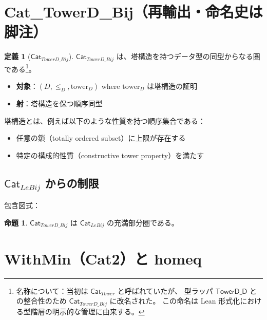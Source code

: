 \documentclass[a4paper,12pt]{ltjsarticle}
\theoremstyle{definition}
\newtheorem{definition}{定義}[section]
\newtheorem{proposition}{命題}[section]
\begin{document}
\section{Cat\_TowerD\_Bij（再輸出・命名史は脚注）}

\begin{definition}[$\mathsf{Cat}_{TowerD\_Bij}$]
$\mathsf{Cat}_{TowerD\_Bij}$ は、塔構造を持つデータ型の同型からなる圏である\footnote{%
  名称について：当初は $\mathsf{Cat}_{Tower}$ と呼ばれていたが、
  型ラッパ $\mathsf{TowerD\_D}$ との整合性のため $\mathsf{Cat}_{TowerD\_Bij}$ に改名された。
  この命名は Lean 形式化における型階層の明示的な管理に由来する。}。

\begin{itemize}
  \item \textbf{対象}：$(D, \le_D, \text{tower}_D)$ where $\text{tower}_D$ は塔構造の証明
  \item \textbf{射}：塔構造を保つ順序同型
\end{itemize}
\end{definition}

塔構造とは、例えば以下のような性質を持つ順序集合である：
\begin{itemize}
  \item 任意の鎖（totally ordered subset）に上限が存在する
  \item 特定の構成的性質（constructive tower property）を満たす
\end{itemize}

\subsection{$\mathsf{Cat}_{LeBij}$ からの制限}

包含図式：
\begin{center}
\end{center}

\begin{proposition}
$\mathsf{Cat}_{TowerD\_Bij}$ は $\mathsf{Cat}_{LeBij}$ の充満部分圏である。
\end{proposition}


\section{WithMin（Cat2）と homeq}
\end{document}
